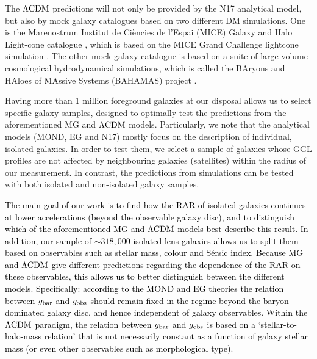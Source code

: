 \documentclass[usenatbib]{mnras}
\newcommand{\lcdm}{{\rm \Lambda CDM}}
\newcommand{\un}[1]{_{\rm #1}}
\begin{document}
The $\lcdm$ predictions will not only be provided by the N17 analytical model, but also by mock galaxy catalogues based on two different DM simulations. One is the Marenostrum Institut de Ci{\`e}ncies de l'Espai (MICE) Galaxy and Halo Light-cone catalogue \cite[]{carretero2015,hoffmann2015}, which is based on the MICE Grand Challenge lightcone simulation \cite[MICE-GC,][]{fosalba2015a,fosalba2015b,crocce2015}. The other mock galaxy catalogue is based on a suite of large-volume cosmological hydrodynamical simulations, which is called the BAryons and HAloes of MAssive Systems (BAHAMAS) project \cite[]{mccarthy2017}.

Having more than 1 million foreground galaxies at our disposal allows us to select specific galaxy samples, designed to optimally test the predictions from the aforementioned MG and $\lcdm$ models. Particularly, we note that the analytical models (MOND, EG and N17) mostly focus on the description of individual, isolated galaxies. In order to test them, we select a sample of galaxies whose GGL profiles are not affected by neighbouring galaxies (satellites) within the radius of our measurement. In contrast, the predictions from simulations can be tested with both isolated and non-isolated galaxy samples.

\textcolor{black}{The main goal of our work is to find how the RAR of isolated galaxies continues at lower accelerations (beyond the observable galaxy disc), and to distinguish which of the aforementioned MG and $\lcdm$ models best describe this result. In addition, our sample of $\sim318,000$ isolated lens galaxies allows us to split them based on observables such as stellar mass, colour and S\'ersic index. Because MG and $\lcdm$ give different predictions regarding the dependence of the RAR on these observables, this allows us to better distinguish between the different models. Specifically: according to the MOND and EG theories the relation between $g\un{bar}$ and $g\un{obs}$ should remain fixed in the regime beyond the baryon-dominated galaxy disc, and hence independent of galaxy observables. Within the $\lcdm$ paradigm, the relation between $g\un{bar}$ and $g\un{obs}$ is based on a `stellar-to-halo-mass relation' that is not necessarily constant as a function of galaxy stellar mass (or even other observables such as morphological type).}
\end{document}
